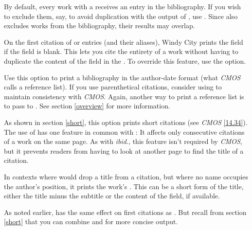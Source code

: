 \documentclass[11pt,letterpaper,oneside]{article}
\begin{document}
\begin{optionlist}

\noindent By default, every work with a  receives
an entry in the bibliography. If you wish to exclude them, say, to
avoid duplication with the output of , use
. Since  also excludes works from the
bibliography, their results may overlap.


\noindent On the first citation of  or
 entries (and their aliases), Windy City prints the
 field if the  field is blank. This
lets you cite the entirety of a work without having to duplicate the
content of the  field in the . To
override this feature, use the  option.


\noindent Use this option to print a bibliography in the author-date
format (what \textit{CMOS} calls a reference list). If you use
parenthetical citations, consider using  to maintain
consistency with \textit{CMOS}. Again, another way to print a
reference list is to pass  to
. See section \ref{overview} for more
information.


\noindent As shown in section \ref{short}, this option prints short
citations (see \textit{CMOS} \ref{14.34}). The use of  has
one feature in common with : It affects only consecutive
citations of a work on the same page. As with \textit{ibid.}, this
feature isn't required by \textit{CMOS}, but it prevents readers from
having to look at another page to find the title of a citation.

In contexts where  would drop a title from a citation, but
where no name occupies the author's position, it prints the work's
. This can be a short form of the title, either
the title minus the subtitle or the content of the
 field, if available.

As noted earlier,  has the same effect on first citations
as . But recall from section \ref{short} that you can
combine  and  for more concise output.



\end{optionlist}
\end{document}
